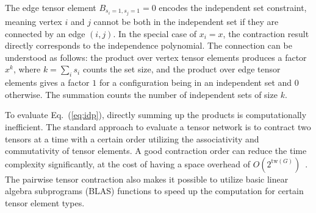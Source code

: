 \documentclass[onefignum, onetabnum]{siamart190516}
\newcommand{\<}{\langle}
\renewcommand{\>}{\rangle}
\newcommand{\Eq}[1]{Eq.~(\ref{#1})}
\begin{document}
The edge tensor element $B_{s_{i}=1, s_{j}=1} = 0$ encodes the independent set constraint, meaning vertex $i$ and $j$ cannot be both in the independent set if they are connected by an edge $(i,j)$.
In the special case of $x_i = x$, the contraction result directly corresponds to the independence polynomial.
The connection can be understood as follows: the product over vertex tensor elements produces a factor $x^k$, where $k=\sum_i s_i$ counts the set size,
and the product over edge tensor elements gives a factor $1$ for a configuration being in an independent set and $0$ otherwise. The summation counts the number of independent sets of size $k$. 

To evaluate \Eq{eq:idp}, directly summing up the products is computationally inefficient.
The standard approach to evaluate a tensor network is to contract two tensors at a time with a certain order utilizing the associativity and commutativity of tensor elements.
A good contraction order can reduce the time complexity significantly, at the cost of having a space overhead of $O(2^{\text{tw}(G)})$~\cite{Markov2008}.
The pairwise tensor contraction also makes it possible to utilize basic linear algebra subprograms (BLAS) functions to speed up the computation for certain tensor element types.
\end{document}
